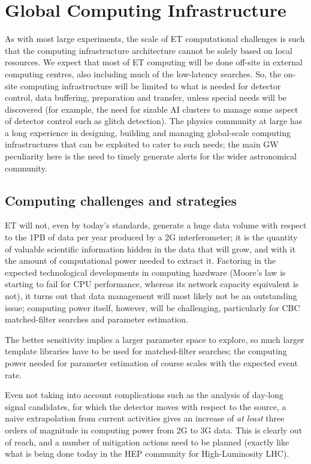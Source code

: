 \chapter{Global Computing Infrastructure}
\label{chap:GlobalComputingInfrastructure}
As with most large experiments, the scale of ET computational challenges is such that the computing infrastructure architecture cannot be solely based on local resources. 
We expect that most of ET computing will be done off-site in external computing centres, also including much of the low-latency searches. 
So, the on-site computing infrastructure will be limited to what is needed for detector control, data buffering, preparation and transfer, unless special needs will be discovered (for example, the need for sizable AI clusters to manage some aspect of detector control such as glitch detection). The physics community at large has a long experience in designing, building and managing global-scale computing infrastructures that can be exploited to cater to such needs; the main GW peculiarity here is the need to timely generate alerts for the wider astronomical community.  

\section[Computing challenges and strategies]{Computing challenges and strategies}
\label{sec:Computing challenges and strategies}
ET will not, even by today's standards, generate a huge data volume with respect to the 1PB of data per year produced by a 2G interferometer; it is the quantity of valuable scientific information hidden in the data that will grow, and with it the amount of computational power needed to extract it.  Factoring in the expected technological developments in computing hardware (Moore's law is starting to fail for CPU performance, whereas its network capacity equivalent is not), it turns out that data management will most likely not be an outstanding issue; computing power itself, however, will be challenging, particularly for CBC matched-filter searches and parameter estimation.

The better sensitivity implies a larger parameter space to explore, so much larger template libraries have to be used for matched-filter searches;  the computing power needed for parameter estimation of course scales with the expected event rate. 


Even not taking into account complications such as the analysis of day-long
signal candidates, for which the detector moves with respect to the source, a naive extrapolation from current activities gives an increase of \emph{at least} three orders of magnitude in computing power from 2G to 3G data. This is clearly out of reach, and a number of mitigation actions need to be planned (exactly like what is being done today in the HEP community for High-Luminosity LHC).

